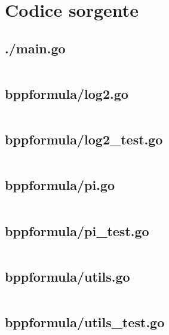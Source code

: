 \newpage
\section{Codice sorgente}

\subsection{./main.go}
\inputminted{go}{../main.go}

\subsection{bppformula/log2.go}
\inputminted{go}{../bppformula/log2.go}

\subsection{bppformula/log2\_test.go}
\inputminted{go}{../bppformula/log2_test.go}

\subsection{bppformula/pi.go}
\inputminted{go}{../bppformula/pi.go}

\subsection{bppformula/pi\_test.go}
\inputminted{go}{../bppformula/pi_test.go}

\subsection{bppformula/utils.go}
\inputminted{go}{../bppformula/utils.go}

\subsection{bppformula/utils\_test.go}
\inputminted{go}{../bppformula/utils_test.go}
